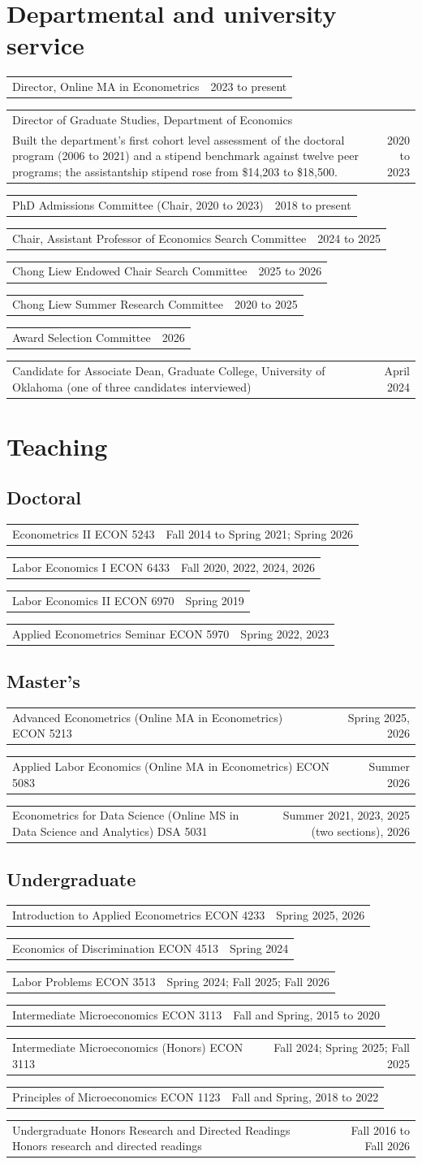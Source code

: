 \documentclass[10.5pt]{article}
\makeatletter
\newcommand{\cvrow}[2]{\noindent\begin{tabularx}{\textwidth}{@{}X r@{}} #1 & {\small\color{gray} #2} \end{tabularx}\par}
\makeatother
\begin{document}
\section{Departmental and university service}
\cvrow{Director, Online MA in Econometrics}{2023 to present}
\cvrow{Director of Graduate Studies, Department of Economics\\ {\small Built the department's first cohort level assessment of the doctoral program (2006 to 2021) and a stipend benchmark against twelve peer programs; the assistantship stipend rose from \$14,203 to \$18,500.}}{2020 to 2023}
\cvrow{PhD Admissions Committee (Chair, 2020 to 2023)}{2018 to present}
\cvrow{Chair, Assistant Professor of Economics Search Committee}{2024 to 2025}
\cvrow{Chong Liew Endowed Chair Search Committee}{2025 to 2026}
\cvrow{Chong Liew Summer Research Committee}{2020 to 2025}
\cvrow{Award Selection Committee}{2026}
\cvrow{Candidate for Associate Dean, Graduate College, University of Oklahoma (one of three candidates interviewed)}{April 2024}
\section{Teaching}
\subsection{Doctoral}
\cvrow{Econometrics II {\small\color{gray} ECON 5243}}{Fall 2014 to Spring 2021; Spring 2026}
\cvrow{Labor Economics I {\small\color{gray} ECON 6433}}{Fall 2020, 2022, 2024, 2026}
\cvrow{Labor Economics II {\small\color{gray} ECON 6970}}{Spring 2019}
\cvrow{Applied Econometrics Seminar {\small\color{gray} ECON 5970}}{Spring 2022, 2023}
\subsection{Master's}
\cvrow{Advanced Econometrics (Online MA in Econometrics) {\small\color{gray} ECON 5213}}{Spring 2025, 2026}
\cvrow{Applied Labor Economics (Online MA in Econometrics) {\small\color{gray} ECON 5083}}{Summer 2026}
\cvrow{Econometrics for Data Science (Online MS in Data Science and Analytics) {\small\color{gray} DSA 5031}}{Summer 2021, 2023, 2025 (two sections), 2026}
\subsection{Undergraduate}
\cvrow{Introduction to Applied Econometrics {\small\color{gray} ECON 4233}}{Spring 2025, 2026}
\cvrow{Economics of Discrimination {\small\color{gray} ECON 4513}}{Spring 2024}
\cvrow{Labor Problems {\small\color{gray} ECON 3513}}{Spring 2024; Fall 2025; Fall 2026}
\cvrow{Intermediate Microeconomics {\small\color{gray} ECON 3113}}{Fall and Spring, 2015 to 2020}
\cvrow{Intermediate Microeconomics (Honors) {\small\color{gray} ECON 3113}}{Fall 2024; Spring 2025; Fall 2025}
\cvrow{Principles of Microeconomics {\small\color{gray} ECON 1123}}{Fall and Spring, 2018 to 2022}
\cvrow{Undergraduate Honors Research and Directed Readings {\small\color{gray} Honors research and directed readings}}{Fall 2016 to Fall 2026}
\end{document}

